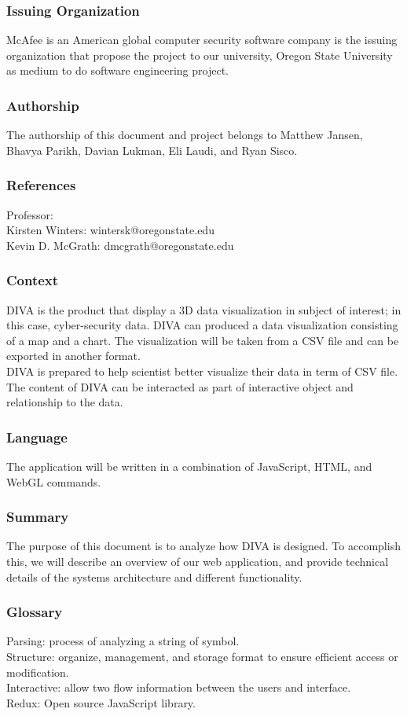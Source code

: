 \documentclass[journal,10pt,onecolumn,compsoc]{IEEEtran} \usepackage[margin=1.0in]{geometry} \usepackage{pdfpages}
\begin{document}
        \subsubsection{Issuing Organization}
        McAfee is an American global computer security software company is the issuing organization that propose the project to our university, Oregon State University as medium to do software engineering project.
        \subsubsection{Authorship}
        The authorship of this document and project belongs to Matthew Jansen, Bhavya Parikh, Davian Lukman, Eli Laudi, and Ryan Sisco.
        \subsubsection{References}
        Professor:\\
        Kirsten Winters: wintersk@oregonstate.edu\\
        Kevin D. McGrath: dmcgrath@oregonstate.edu
        \subsubsection{Context}
        DIVA is the product that display a 3D data visualization in subject of interest; in this case, cyber-security data. DIVA can produced a data visualization  consisting of a map and a chart. The visualization will be taken from a CSV file and can be exported in another format.\\
        DIVA is prepared to help scientist better visualize their data in term of CSV file. The content of DIVA can be interacted as part of interactive object and relationship to the data. 
        \subsubsection{Language}
        The application will be written in a combination of JavaScript, HTML, and WebGL commands.
        \subsubsection{Summary}
        The purpose of this document is to analyze how DIVA is designed. To accomplish this, we will describe an overview of our web application, and provide technical details of the systems architecture and different functionality.  
        \subsubsection{Glossary}
        Parsing: process of analyzing a string of symbol.\\
        Structure: organize, management, and storage format to ensure efficient access or modification.\\
        Interactive: allow two flow information between the users and interface.\\
        Redux: Open source JavaScript library.
\end{document}
